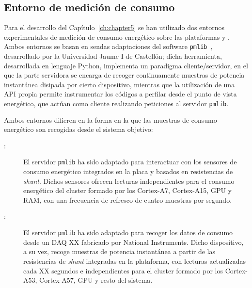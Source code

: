 
\subsection{Entorno de medición de consumo}

Para el desarrollo del Capítulo~\ref{ch:chapter5} se han utilizado dos entornos experimentales de medición de consumo
energético sobre las plataformas \odroid y \juno. Ambos entornos se basan en sendas adaptaciones del software {\tt pmlib}~\cite{pmlib},
desarrollado por la Universidad Jaume I de Castellón; dicha herramienta, desarrollada en lenguaje Python, implementa un paradigma
 cliente/servidor, en el que la parte servidora se encarga de recoger continuamente muestras de potencia instantánea disipada
por cierto dispositivo, mientras que la utilización de una API propia permite instrumentar los códigos a perfilar desde el
punto de vista energético, que actúan como cliente realizando peticiones al servidor {\tt pmlib}.

Ambos entornos difieren en la forma en la que las muestras de consumo energético son recogidas desde el sistema objetivo:

\begin{description}

\item[\odroid:] El servidor {\tt pmlib} ha sido adaptado para interactuar con los sensores de consumo energético integrados 
en la placa y basados en resistencias de {\em shunt}. Dichos sensores ofrecen lecturas independientes para el consumo energético
del cluster formado por los Cortex-A7, Cortex-A15, GPU y RAM, con una frecuencia de refresco de cuatro muestras por segundo.

\item[\juno:] El servidor {\tt pmlib} ha sido adaptado para recoger los datos de consumo desde un DAQ XX fabricado por National
Instruments. Dicho dispositivo, a su vez, recoge muestras de potencia instantánea a partir de las resistencias de {\em shunt}
integradas en la plataforma, con lecturas actualizadas cada XX segundos e independientes para el cluster formado por los 
Cortex-A53, Cortex-A57, GPU y resto del sistema.

\end{description}

